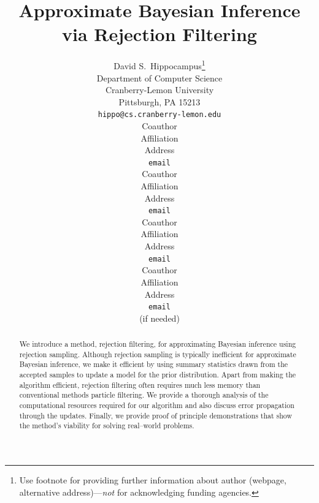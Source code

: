 \documentclass{article} %
\begin{document}


\title{Approximate Bayesian Inference via Rejection Filtering}
\author{
David S.~Hippocampus\thanks{ Use footnote for providing further information
about author (webpage, alternative address)---\emph{not} for acknowledging
funding agencies.} \\
Department of Computer Science\\
Cranberry-Lemon University\\
Pittsburgh, PA 15213 \\
\texttt{hippo@cs.cranberry-lemon.edu} \\
\And
Coauthor \\
Affiliation \\
Address \\
\texttt{email} \\
\AND
Coauthor \\
Affiliation \\
Address \\
\texttt{email} \\
\And
Coauthor \\
Affiliation \\
Address \\
\texttt{email} \\
\And
Coauthor \\
Affiliation \\
Address \\
\texttt{email} \\
(if needed)\\
}

\maketitle



\begin{abstract}
We introduce a method, rejection filtering, for approximating Bayesian inference
using rejection sampling.
Although rejection sampling is typically inefficient for approximate Bayesian inference, 
we make it efficient by using summary statistics drawn from the accepted samples to update a model for the prior distribution.
Apart from making the algorithm efficient, rejection filtering often requires
much less memory than conventional methods particle filtering.  We provide a thorough analysis
of the computational resources required for our algorithm and also discuss error propagation through the updates.
Finally, we provide proof of principle demonstrations that show the method's viability for solving real--world problems.
\end{abstract}
\end{document}
